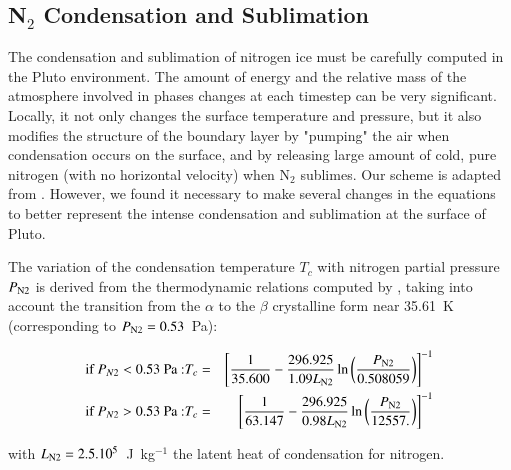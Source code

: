 \subsection{N$_2$ Condensation and Sublimation}
\label{sc:cond}
\def\dem{\frac{1}{2}}

The condensation and sublimation of nitrogen ice must be carefully computed in the
Pluto environment. The amount of energy and the relative mass of the atmosphere
involved in phases changes at each timestep can be very significant. 
Locally, it not only changes
the surface temperature and pressure, but it also modifies the structure of the
boundary layer by "pumping" the air when condensation occurs on the surface,
and by releasing large amount of cold, pure nitrogen (with no horizontal velocity)
when N$_2$ sublimes. 
Our scheme is adapted from \citet{Forg:98}. However, we found it necessary to 
make several changes in the equations to better represent the 
intense condensation and sublimation at the surface of Pluto.

The variation of the condensation temperature $T_c$ with nitrogen partial
 pressure $P_{\mbox{\scriptsize N2}}$  is derived from the thermodynamic relations computed by 
 \cite{Fray:09},
taking into account the transition from the $\alpha$ to the $\beta$ crystalline form near 35.61~K
(corresponding to $P_{\mbox{\scriptsize N2}}=0.53$~Pa):


\begin{eqnarray}
\mbox{if } P_{N2} <0.53 \mbox{ Pa :} & 
T_c  = &  \left[ \frac{1}{35.600} - \frac{296.925}{1.09 L_{\mbox{\scriptsize N2}}} 
\ln{\left( \frac{P_{\mbox{\scriptsize N2}}}{0.508059} \right) } \right]^{-1} 
\\
\mbox{if } P_{N2} >0.53 \mbox{ Pa :} & 
T_c  = & \left[ \frac{1}{63.147} - \frac{296.925}{0.98 L_{\mbox{\scriptsize N2}}} 
\ln{ \left( \frac{P_{\mbox{\scriptsize N2}}}{12557.}\right) } \right] ^{-1} 
\end{eqnarray}

with $L_{\mbox{\scriptsize N2}} =2.5.10^{5}$~J~kg$^{-1}$ the latent heat of
condensation for nitrogen.
 
